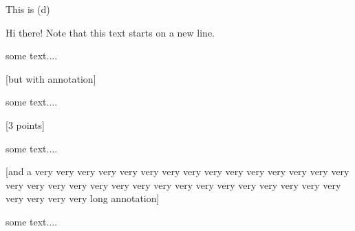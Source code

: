 \documentclass[11pt,a4paper]{article}
\begin{document}
\begin{exenumerate}\setcounter{exenumeratei}{3}
\item This is (d)
\end{exenumerate}


Hi there! Note that this text starts on a new line.



some text....


[but with annotation]

some text....

[3 points]

some text....

[and a very very very very very very very very very very
very very very very very very very very very very
very very very very very very very very very very
very very very very very long annotation]

some text....
\end{document}
